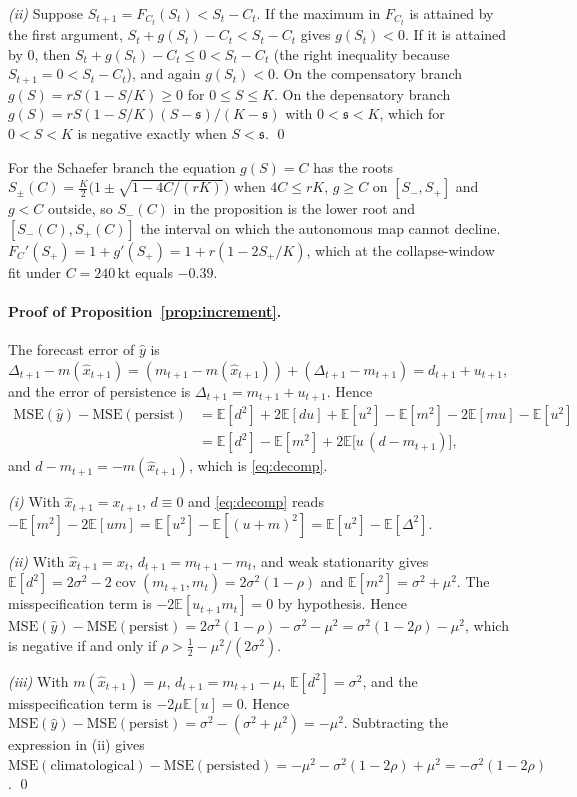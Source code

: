 \documentclass[preprint,11pt,authoryear]{elsarticle}
\theoremstyle{definition}
\theoremstyle{remark}
\newcommand{\kt}{\,\mathrm{kt}}
\newcommand{\MSE}{\mathrm{MSE}}
\newcommand{\pers}{\mathrm{persist}}
\newcommand{\sA}{\mathfrak{s}}
\newcommand{\E}{\mathbb{E}}
\begin{document}
\emph{(ii)} Suppose $S_{t+1} = F_{C_t}(S_t) < S_t - C_t$. If the maximum in $F_{C_t}$ is attained by the first argument, $S_t + g(S_t) - C_t < S_t - C_t$ gives $g(S_t) < 0$. If it is attained by $0$, then $S_t + g(S_t) - C_t \le 0 < S_t - C_t$ (the right inequality because $S_{t+1} = 0 < S_t - C_t$), and again $g(S_t) < 0$. On the compensatory branch $g(S) = rS(1-S/K) \ge 0$ for $0 \le S \le K$. On the depensatory branch $g(S) = rS(1-S/K)(S-\sA)/(K-\sA)$ with $0<\sA<K$, which for $0<S<K$ is negative exactly when $S<\sA$. \qed

For the Schaefer branch the equation $g(S)=C$ has the roots $S_\pm(C) = \tfrac{K}{2}\bigl(1\pm\sqrt{1-4C/(rK)}\bigr)$ when $4C\le rK$, $g\ge C$ on $[S_-,S_+]$ and $g<C$ outside, so $S_-(C)$ in the proposition is the lower root and $[S_-(C),S_+(C)]$ the interval on which the autonomous map cannot decline. $F_C'(S_+) = 1 + g'(S_+) = 1 + r(1-2S_+/K)$, which at the collapse-window fit under $C=240\kt$ equals $-0.39$.

\paragraph{Proof of Proposition~\ref{prop:increment}.} The forecast error of $\hat y$ is $\Delta_{t+1}-m(\hat x_{t+1}) = (m_{t+1}-m(\hat x_{t+1})) + (\Delta_{t+1}-m_{t+1}) = d_{t+1}+u_{t+1}$, and the error of persistence is $\Delta_{t+1} = m_{t+1}+u_{t+1}$. Hence
\begin{align*}
\MSE(\hat y)-\MSE(\pers) &= \E[d^2]+2\E[du]+\E[u^2] - \E[m^2]-2\E[mu]-\E[u^2]\\
&= \E[d^2]-\E[m^2] + 2\E\bigl[u\,(d-m_{t+1})\bigr],
\end{align*}
and $d-m_{t+1} = -m(\hat x_{t+1})$, which is \eqref{eq:decomp}.

\emph{(i)} With $\hat x_{t+1}=x_{t+1}$, $d\equiv 0$ and \eqref{eq:decomp} reads $-\E[m^2]-2\E[um] = \E[u^2]-\E[(u+m)^2] = \E[u^2]-\E[\Delta^2]$.

\emph{(ii)} With $\hat x_{t+1}=x_t$, $d_{t+1}=m_{t+1}-m_t$, and weak stationarity gives $\E[d^2] = 2\sigma^2 - 2\operatorname{cov}(m_{t+1},m_t) = 2\sigma^2(1-\rho)$ and $\E[m^2]=\sigma^2+\mu^2$. The misspecification term is $-2\E[u_{t+1}m_t]=0$ by hypothesis. Hence $\MSE(\hat y)-\MSE(\pers) = 2\sigma^2(1-\rho)-\sigma^2-\mu^2 = \sigma^2(1-2\rho)-\mu^2$, which is negative if and only if $\rho > \tfrac12 - \mu^2/(2\sigma^2)$.

\emph{(iii)} With $m(\hat x_{t+1})=\mu$, $d_{t+1}=m_{t+1}-\mu$, $\E[d^2]=\sigma^2$, and the misspecification term is $-2\mu\E[u]=0$. Hence $\MSE(\hat y)-\MSE(\pers) = \sigma^2-(\sigma^2+\mu^2) = -\mu^2$. Subtracting the expression in (ii) gives $\MSE(\text{climatological})-\MSE(\text{persisted}) = -\mu^2 - \sigma^2(1-2\rho)+\mu^2 = -\sigma^2(1-2\rho)$. \qed
\end{document}
